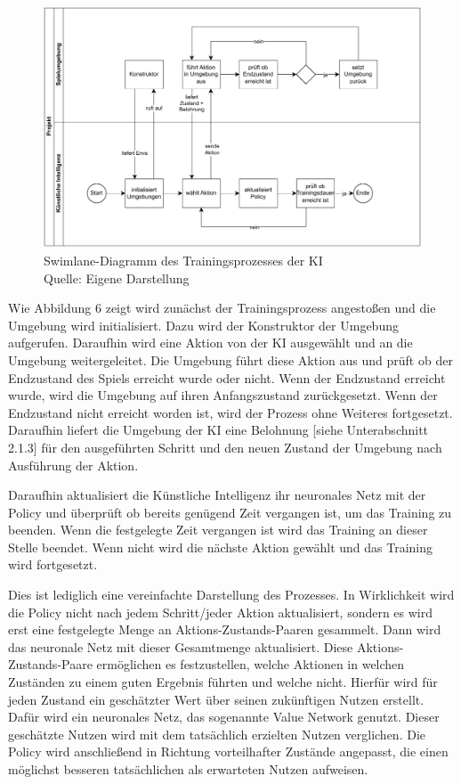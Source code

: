 \nopagebreak
\begin{figure}[H]
	\includegraphics[width=1\textwidth]{Bilder/swimlane.drawio.pdf} 
	\caption[Swimlane-Diagramm des Trainingsprozesses der KI]{Swimlane-Diagramm des Trainingsprozesses der KI\\ Quelle: Eigene Darstellung}
\end{figure}	

Wie Abbildung 6 zeigt wird zunächst der Trainingsprozess angestoßen und die Umgebung wird initialisiert. Dazu wird der Konstruktor der Umgebung aufgerufen. Daraufhin wird eine Aktion von der KI ausgewählt und an die Umgebung weitergeleitet. Die Umgebung führt diese Aktion aus und prüft ob der Endzustand des Spiels erreicht wurde oder nicht. Wenn der Endzustand erreicht wurde, wird die Umgebung auf ihren Anfangszustand zurückgesetzt. Wenn der Endzustand nicht erreicht worden ist, wird der Prozess ohne Weiteres fortgesetzt. Daraufhin liefert die Umgebung der KI eine Belohnung [siehe Unterabschnitt 2.1.3] für den ausgeführten Schritt und den neuen Zustand der Umgebung nach Ausführung der Aktion.

Daraufhin aktualisiert die Künstliche Intelligenz ihr neuronales Netz mit der Policy und überprüft ob bereits genügend Zeit vergangen ist, um das Training zu beenden. Wenn die festgelegte Zeit vergangen ist wird das Training an dieser Stelle beendet. Wenn nicht wird die nächste Aktion gewählt und das Training wird fortgesetzt.

Dies ist lediglich eine vereinfachte Darstellung des Prozesses. In Wirklichkeit wird die Policy nicht nach jedem Schritt/jeder Aktion aktualisiert, sondern es wird erst eine festgelegte Menge an Aktions-Zustands-Paaren gesammelt. Dann wird das neuronale Netz mit dieser Gesamtmenge aktualisiert. Diese Aktions-Zustands-Paare ermöglichen es festzustellen, welche Aktionen in welchen Zuständen zu einem guten Ergebnis führten und welche nicht. Hierfür wird für jeden Zustand ein geschätzter Wert über seinen zukünftigen Nutzen erstellt. Dafür wird ein neuronales Netz, das sogenannte Value Network genutzt. Dieser geschätzte Nutzen wird mit dem tatsächlich erzielten Nutzen verglichen. Die Policy wird anschließend in Richtung vorteilhafter Zustände angepasst, die einen möglichst besseren tatsächlichen als erwarteten Nutzen aufweisen.
